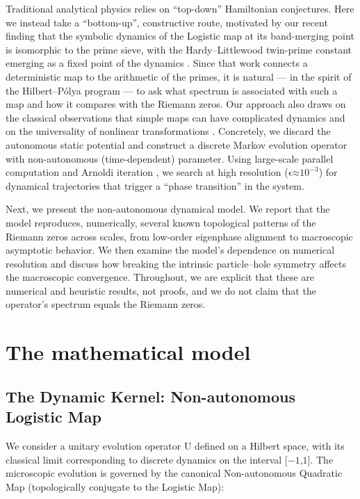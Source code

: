Traditional analytical physics relies on ``top-down'' Hamiltonian
conjectures. Here we instead take a ``bottom-up'', constructive route,
motivated by our recent finding that the symbolic dynamics of the
Logistic map at its band-merging point is isomorphic to the prime sieve,
with the Hardy--Littlewood twin-prime constant emerging as a fixed point
of the dynamics \cite{wang2026}. Since that work connects a deterministic
map to the arithmetic of the primes, it is natural --- in the spirit of
the Hilbert--Pólya program --- to ask what spectrum is associated with
such a map and how it compares with the Riemann zeros. Our approach also
draws on the classical observations that simple maps can have complicated
dynamics \cite{may1976} and on the universality of nonlinear transformations
\cite{feigenbaum1978}. Concretely, we discard the autonomous static potential
and construct a discrete Markov evolution operator with non-autonomous
(time-dependent) parameter. Using large-scale parallel computation and
Arnoldi iteration \cite{arpack1998}, we search at high resolution
(\(\text{ϵ≈}\text{10}^{\text{−3}}\)) for dynamical trajectories that
trigger a ``phase transition'' in the system.

Next, we present the non-autonomous dynamical model. We report that the
model reproduces, numerically, several known topological patterns of the
Riemann zeros across scales, from low-order eigenphase alignment to
macroscopic asymptotic behavior. We then examine the model's dependence
on numerical resolution and discuss how breaking the intrinsic
particle--hole symmetry affects the macroscopic convergence. Throughout,
we are explicit that these are numerical and heuristic results, not
proofs, and we do not claim that the operator's spectrum equals the
Riemann zeros.

\section*{The mathematical model}

\subsection*{The Dynamic Kernel: Non-autonomous Logistic Map}

We consider a unitary evolution operator \(\text{U}\) defined on a
Hilbert space, with its classical limit corresponding to discrete
dynamics on the interval \(\text{[−1,1]}\). The microscopic evolution is
governed by the canonical Non-autonomous Quadratic Map (topologically
conjugate to the Logistic Map):

